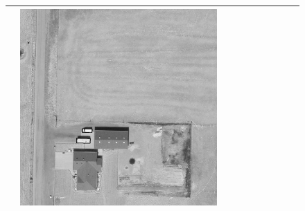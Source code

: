 \begin{figure}[h!]
\begin{tabularx}{\textwidth}{c|*{9}{X}}
    & \includegraphics[trim={300pt 355pt 610pt 570pt},clip,width=\linewidth]{images/015Results/03ablation/comp_images/ground_truth/198.png} \\ \hline


\end{tabularx}
\end{figure}
